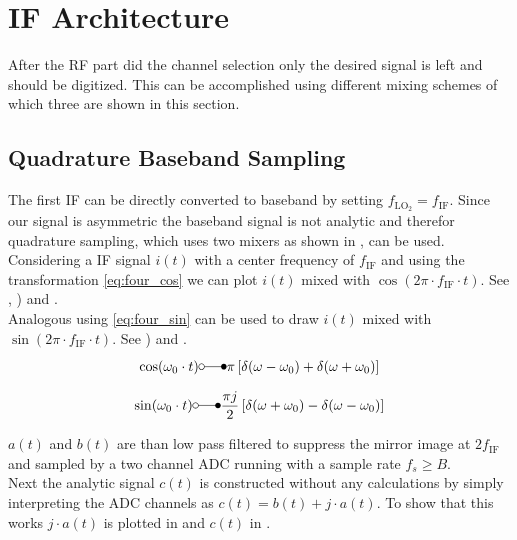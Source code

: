 \section{IF Architecture}
After the \gls{RF} part did the channel selection only the desired signal
is left and should be digitized.
This can be accomplished using different
mixing schemes of which three are shown in this section. \\

\subsection{Quadrature Baseband Sampling}
\label{sec:rx_adc_1}
The first \gls{IF} can be directly converted to baseband by
setting $f_{\text{LO}_2} = f_{\text{IF}}$.
Since our signal is asymmetric the baseband signal is not analytic
and therefor quadrature sampling, which uses two mixers as shown in
, can be used. \\

Considering a \gls{IF} signal $i(t)$ with a center frequency of $f_{\text{IF}}$
and using the transformation \eqref{eq:four_cos}
we can plot $i(t)$ mixed with $\cos(2\pi \cdot f_{\text{IF}} \cdot t)$.
See , )
and . \\

Analogous using \eqref{eq:four_sin} can be used to draw $i(t)$ mixed with
$\sin(2\pi \cdot f_{\text{IF}} \cdot t)$.
See ) and . \\

\begin{align}
  \label{eq:four_cos}
  \cos(\omega_0 \cdot t) \laplace \pi
  \left[\delta(\omega - \omega_0) + \delta(\omega + \omega_0) \right]
\end{align}

\begin{align}
  \label{eq:four_sin}
  \sin(\omega_0 \cdot t) \laplace \frac{\pi j}{2}
  \left[\delta(\omega + \omega_0) - \delta(\omega - \omega_0) \right]
\end{align}

$a(t)$ and $b(t)$ are than low pass filtered to suppress the mirror image
at $2 f_{\text{IF}}$ and sampled by a two channel \gls{ADC} running with a
sample rate $f_s \geq B$. \\

Next the analytic signal $c(t)$ is constructed without any calculations
by simply interpreting the \gls{ADC} channels as
$c(t) = b(t) + j \cdot a(t)$. To show that this works $j \cdot a(t)$
is plotted in  and
$c(t)$ in .

